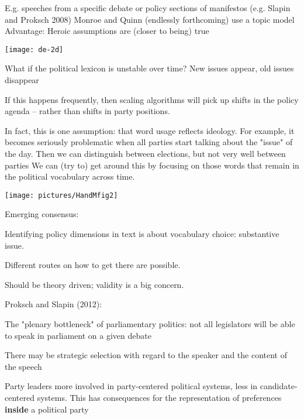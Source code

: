 \documentclass[kp]{foilpack}
\begin{document}
\itm E.g. speeches from a specific debate or policy sections of manifestos (e.g.  Slapin and Proksch 2008)
\itm Monroe and Quinn (endlessly forthcoming) use a topic model
\itz
Advantage: Heroic assumptions are (closer to being) true



\centerline{\texttt{[image: de-2d]}}



What if the political lexicon is unstable over time?
\ita
\itm New issues appear, old issues disappear
\itz


If this happens frequently, then scaling algorithms will pick up shifts in the policy agenda -- rather than shifts in party positions. 

\ita
\itm In fact, this is one assumption: that word usage reflects ideology.
\itm For example, it becomes seriously problematic when all parties start talking about the "issue" of the day. Then we can distinguish between elections, but not very well between parties
\itm We can (try to) get around this by focusing on those words that remain in the political vocabulary across time.
\itz



\centerline{\texttt{[image: pictures/HandMfig2]}}




Emerging consensus: \vspace{0.2cm}

Identifying  policy dimensions in text is about vocabulary choice: substantive issue.

Different routes on how to get there are possible. 

Should be theory driven; validity is a big concern. 



Proksch and Slapin (2012):

\ita

\itm The "plenary bottleneck" of parliamentary politics: not all legislators will be able to speak in parliament on a given debate

\itm There may be strategic selection with regard to the speaker and the content of the speech

\itm Party leaders more involved in party-centered political systems, less in candidate-centered systems. This has consequences for the representation of preferences {\bf inside} a political party
\end{document}
